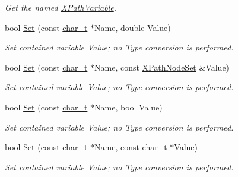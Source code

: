 \begin{DoxyCompactItemize}
\begin{DoxyCompactList}\small\item\em Get the named \hyperlink{classMezzanine_1_1xml_1_1XPathVariable}{XPathVariable}. \item\end{DoxyCompactList}\item 
bool \hyperlink{classMezzanine_1_1xml_1_1XPathVariableSet_a288c5563e13242a288e5fd6039e05ac9}{Set} (const \hyperlink{namespaceMezzanine_1_1xml_a29b8a47c179e9895c4e9e66c45d1dbbc}{char\_\-t} $\ast$Name, double Value)
\begin{DoxyCompactList}\small\item\em Set contained variable Value; no Type conversion is performed. \item\end{DoxyCompactList}\item 
bool \hyperlink{classMezzanine_1_1xml_1_1XPathVariableSet_af80e8850b35321d940f3d28ef790d293}{Set} (const \hyperlink{namespaceMezzanine_1_1xml_a29b8a47c179e9895c4e9e66c45d1dbbc}{char\_\-t} $\ast$Name, const \hyperlink{classMezzanine_1_1xml_1_1XPathNodeSet}{XPathNodeSet} \&Value)
\begin{DoxyCompactList}\small\item\em Set contained variable Value; no Type conversion is performed. \item\end{DoxyCompactList}\item 
bool \hyperlink{classMezzanine_1_1xml_1_1XPathVariableSet_a4a6869fd2479c17fe5c63f0fc7d5e3e9}{Set} (const \hyperlink{namespaceMezzanine_1_1xml_a29b8a47c179e9895c4e9e66c45d1dbbc}{char\_\-t} $\ast$Name, bool Value)
\begin{DoxyCompactList}\small\item\em Set contained variable Value; no Type conversion is performed. \item\end{DoxyCompactList}\item 
bool \hyperlink{classMezzanine_1_1xml_1_1XPathVariableSet_ae2d9e342f6d389ddb5ce7eb7a79bc7af}{Set} (const \hyperlink{namespaceMezzanine_1_1xml_a29b8a47c179e9895c4e9e66c45d1dbbc}{char\_\-t} $\ast$Name, const \hyperlink{namespaceMezzanine_1_1xml_a29b8a47c179e9895c4e9e66c45d1dbbc}{char\_\-t} $\ast$Value)
\begin{DoxyCompactList}\small\item\em Set contained variable Value; no Type conversion is performed. \item\end{DoxyCompactList}\end{DoxyCompactItemize}


